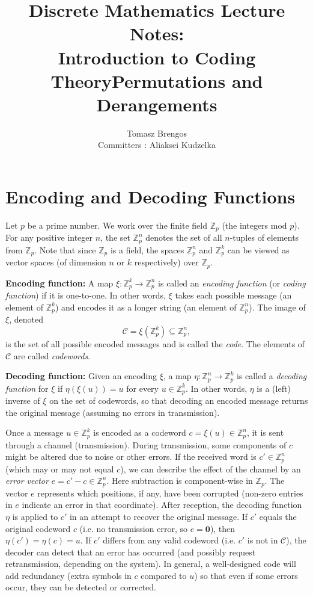 \documentclass[docmute]{article}
\title{Discrete Mathematics Lecture Notes:\\Introduction to Coding Theory}
\author{}
\date{}
\title{Permutations and Derangements}
\author{Tomasz Brengos \\  
Committers : Aliaksei Kudzelka}
\date{}
\begin{document}
\maketitle


\section{Encoding and Decoding Functions}

Let $p$ be a prime number. We work over the finite field $\mathbb{Z}_p$ (the integers mod $p$). For any positive integer $n$, the set $\mathbb{Z}_p^n$ denotes the set of all $n$-tuples of elements from $\mathbb{Z}_p$. Note that since $\mathbb{Z}_p$ is a field, the spaces $\mathbb{Z}_p^n$ and $\mathbb{Z}_p^k$ can be viewed as vector spaces (of dimension $n$ or $k$ respectively) over $\mathbb{Z}_p$.

\medskip

\noindent \textbf{Encoding function:} A map $\xi: \mathbb{Z}_p^k \to \mathbb{Z}_p^n$ is called an \emph{encoding function} (or \emph{coding function}) if it is one-to-one. In other words, $\xi$ takes each possible message (an element of $\mathbb{Z}_p^k$) and encodes it as a longer string (an element of $\mathbb{Z}_p^n$). The image of $\xi$, denoted 
\[ \mathcal{C} = \xi(\mathbb{Z}_p^k) \subseteq \mathbb{Z}_p^n, \] 
is the set of all possible encoded messages and is called the \emph{code}. The elements of $\mathcal{C}$ are called \emph{codewords}.

\medskip

\noindent \textbf{Decoding function:} Given an encoding $\xi$, a map $\eta: \mathbb{Z}_p^n \to \mathbb{Z}_p^k$ is called a \emph{decoding function} for $\xi$ if $\eta(\xi(u)) = u$ for every $u \in \mathbb{Z}_p^k$. In other words, $\eta$ is a (left) inverse of $\xi$ on the set of codewords, so that decoding an encoded message returns the original message (assuming no errors in transmission).

\medskip

Once a message $u \in \mathbb{Z}_p^k$ is encoded as a codeword $c = \xi(u) \in \mathbb{Z}_p^n$, it is sent through a channel (transmission). During transmission, some components of $c$ might be altered due to noise or other errors. If the received word is $c' \in \mathbb{Z}_p^n$ (which may or may not equal $c$), we can describe the effect of the channel by an \emph{error vector} $e = c' - c \in \mathbb{Z}_p^n$. Here subtraction is component-wise in $\mathbb{Z}_p$. The vector $e$ represents which positions, if any, have been corrupted (non-zero entries in $e$ indicate an error in that coordinate). After reception, the decoding function $\eta$ is applied to $c'$ in an attempt to recover the original message. If $c'$ equals the original codeword $c$ (i.e. no transmission error, so $e=\mathbf{0}$), then $\eta(c') = \eta(c) = u$. If $c'$ differs from any valid codeword (i.e. $c'$ is not in $\mathcal{C}$), the decoder can detect that an error has occurred (and possibly request retransmission, depending on the system). In general, a well-designed code will add redundancy (extra symbols in $c$ compared to $u$) so that even if some errors occur, they can be detected or corrected.
\end{document}
